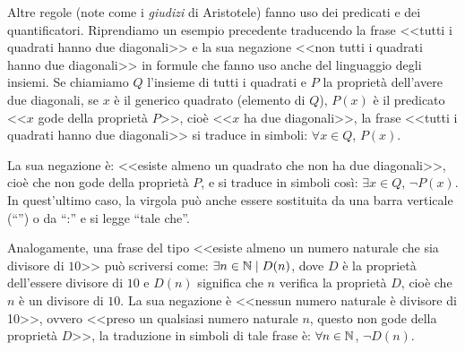 Altre regole (note come i \emph{giudizi} di Aristotele) fanno uso dei predicati e dei quantificatori. Riprendiamo un esempio precedente traducendo la frase <<tutti i quadrati hanno due diagonali>> e la sua negazione <<non tutti i quadrati hanno due diagonali>> in formule che fanno uso anche del linguaggio degli insiemi. Se chiamiamo $Q$ l'insieme di tutti i quadrati e $P$ la proprietà dell'avere due diagonali, se $x$ è il generico quadrato (elemento di $Q$), $P(x)$ è il predicato <<$x$ gode della proprietà $P$>>, cioè <<$x$ ha due diagonali>>, la frase <<tutti i quadrati hanno due diagonali>> si traduce in simboli: ${\forall}x\in Q$, $P(x)$.

La sua negazione è: <<esiste almeno un quadrato che non ha due diagonali>>, cioè che non gode della proprietà $P$, e si traduce in simboli così: $\exists x\in Q$, $\neg P(x)$.
In quest'ultimo caso, la virgola può anche essere sostituita da una barra verticale (``\textbar'') o da ``:'' e si legge ``tale che''.

Analogamente, una frase del tipo <<esiste almeno un numero naturale che sia divisore di $10$>> può scriversi come: $\exists n\in\mathbb{N}\mid D(n)$, dove $D$ è la proprietà dell'essere divisore di $10$ e $D(n)$ significa che $n$ verifica la proprietà $D$, cioè che $n$ è un divisore di $10$. La sua negazione è <<nessun numero naturale è divisore di 10>>, ovvero <<preso un qualsiasi numero naturale $n$, questo non gode della proprietà $D$>>, la traduzione in simboli di tale frase è: $\forall n\in\mathbb{N}$, ${\neg}D(n)$.

